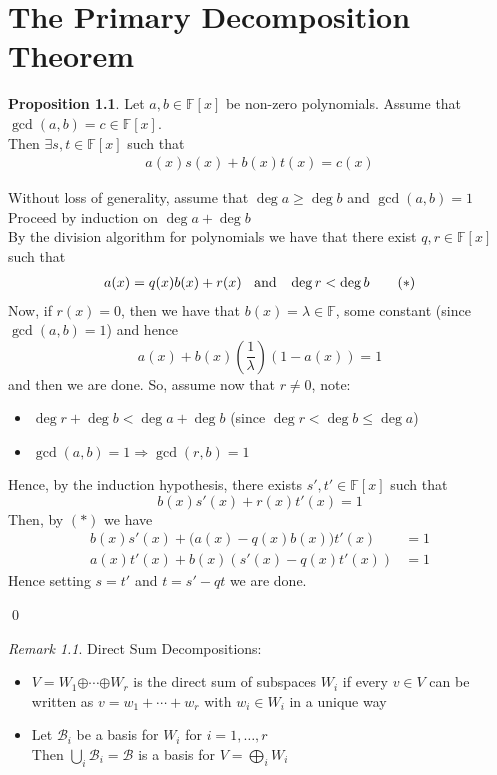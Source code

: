 \documentclass[11pt, a4paper]{report}
\makeatletter
\numberwithin{equation}{section}
\newcommand{\opl}{\boldsymbol{\oplus}}
\newcommand{\F}{\mathbb{F}}
\numberwithin{equation}{subsection}
\theoremstyle{plain}
\theoremstyle{definition}
\newtheorem{prop}[thm]{Proposition}
\theoremstyle{remark}
\newtheorem*{rem}{Remark}
\newtheorem*{prf}{Proof}
\renewenvironment{prf}[1][\proofname]{\par
  \vspace{-\topsep}%
  \normalfont
  \topsep0pt \partopsep0pt %
  \trivlist
  \item[\hskip\labelsep
        \itshape
    #1\@addpunct{.}]\ignorespaces
}{%
  \popQED\endtrivlist\@endpefalse
  \addvspace{6pt plus 6pt} %
}
\newcommand{\pr}[1]{\begin{adjustwidth}{1cm}{} \begin{prf} #1 \end{prf} \end{adjustwidth}}
\makeatother
\begin{document}
\chapter{The Primary Decomposition Theorem}

\begin{prop}
Let $a, b \in \F[x]$ be non-zero polynomials. Assume that $\gcd(a,b) = c \in \F[x]$.\\ Then $\exists s,t \in \F[x]$ such that 
\begin{align*} 
a(x)s(x) + b(x)t(x) = c(x)
\end{align*}

\pr{
Without loss of generality, assume that $\deg a \geq \deg b$ and $\gcd(a,b) = 1$\\
Proceed by induction on $\deg a + \deg b$\\
By the division algorithm for polynomials we have that there exist $q,r \in \F[x]$ such that
\begin{align*} a(x) = q(x)b(x) + r(x) \text{\;\; and \;\;} \deg r < \deg b  \tag{$*$} \end{align*}
Now, if $r(x) = 0$, then we have that $b(x) = \lambda \in \F$, some constant (since $\gcd(a,b) = 1$) and hence
$$a(x) + b(x)\left(\frac{1}{\lambda}\right)(1 - a(x)) = 1$$
and then we are done. So, assume now that $r \neq 0$, note:
\begin{itemize}
\item $\deg r + \deg b < \deg a + \deg b$ \hfill(since $\deg r < \deg b \leq \deg a$)
\item $\gcd(a,b) = 1 \Longrightarrow \gcd(r,b) = 1$
\end{itemize}
Hence, by the induction hypothesis, there exists $s', t' \in \F[x]$ such that
$$b(x)s'(x)+ r(x)t'(x) = 1$$
Then, by $(*)$ we have
\begin{align*}
b(x)s'(x) + \big( a(x) - q(x)b(x) \big) t'(x) &= 1\\
a(x)t'(x) + b(x) \left( s'(x) - q(x) t'(x) \right) &= 1
\end{align*}
Hence setting $s = t'$ and $t = s' - qt$ we are done.
}\qed
\end{prop}

\newpage

\begin{rem} Direct Sum Decompositions:
\begin{itemize}
\item $V = W_1 \opl \cdots \opl W_r$ is the direct sum of subspaces $W_i$ if every $v \in V$ can be written as $v = w_1 + \cdots + w_r$ with $w_i \in W_i$ in a unique way

\item Let $\mathcal{B}_i$ be a basis for $W_i$ for $i = 1, \ldots, r$\\ Then $\bigcup_i \mathcal{B}_i = \mathcal{B}$ is a basis for $V = \bigoplus_i W_i$
\end{itemize}
\end{rem}
\end{document}
